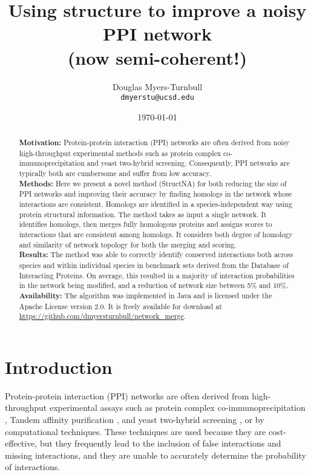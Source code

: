 \documentclass[12pt,twoside]{article}
\def\NI{\noindent}
\begin{document}
\title{\textbf{Using structure to improve a noisy PPI network} \\ \Large{(now semi-coherent!)}}
\author{Douglas Myers-Turnbull\\ \texttt{dmyerstu@ucsd.edu}}
\date{\small{\today}}
\maketitle

\begin{abstract}
\NI \textbf{Motivation: } Protein-protein interaction (PPI) networks are often derived from noisy high-throughput experimental methods such as protein complex co-immunoprecipitation and yeast two-hybrid screening. Consequently, PPI networks are typically both are cumbersome and suffer from low accuracy.\\
\NI \textbf{Methods: } Here we present a novel method (StructNA) for both reducing the size of PPI networks and improving their accuracy by finding homologs in the network whose interactions are consistent. Homologs are identified in a species-independent way using protein structural information. The method takes as input a single network. It identifies homologs, then merges fully homologous proteins and assigns scores to  interactions that are consistent among homologs. It considers both degree of homology and similarity of network topology for both the merging and scoring.\\
\NI \textbf{Results: } The method was able to correctly identify conserved interactions both across species and within individual species in benchmark sets derived from the Database of Interacting Proteins. On average, this resulted in a majority of interaction probabilities in the network being modified, and a reduction of network size between 5\% and 10\%. \\
\NI \textbf{Availability: } The algorithm was implemented in Java and is licensed under the Apache License version 2.0. It is freely available for download at \url{https://github.com/dmyersturnbull/network_merge}.
\end{abstract}

\section{Introduction}
\NI Protein-protein interaction (PPI) networks are often derived from high-throughput experimental assays such as protein complex co-immunoprecipitation \cite{kaboord}, Tandem affinity purification \cite{rigaut}, and yeast two-hybrid screening \cite{fields}, or by computational techniques. These techniques are used because they are cost-effective, but they frequently lead to the inclusion of false interactions and missing interactions, and they are unable to accurately determine the probability of interactions.
\end{document}
